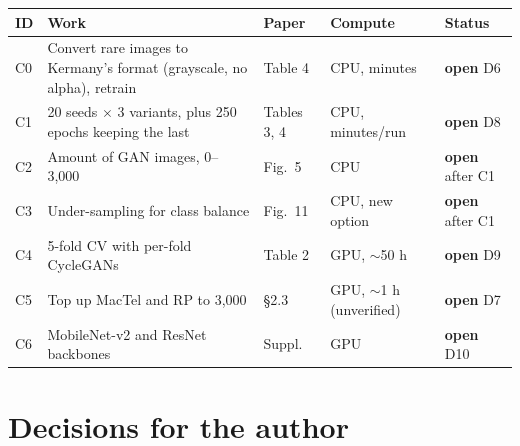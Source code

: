 \documentclass[10pt,a4paper]{article}
\newcommand{\todo}{\textcolor{bad}{\textbf{open}}}
\begin{document}
\noindent
\begin{tabularx}{\linewidth}{@{}l Y l l l@{}}
\toprule
ID & Work & Paper & Compute & Status \\
\midrule
C0 & Convert rare images to Kermany's format (grayscale, no alpha), retrain & Table 4 & CPU, minutes & \todo{} D6 \\
C1 & 20 seeds $\times$ 3 variants, plus 250 epochs keeping the last & Tables 3, 4 & CPU, minutes/run & \todo{} D8 \\
C2 & Amount of GAN images, 0--3,000 & Fig.~5 & CPU & \todo{} after C1 \\
C3 & Under-sampling for class balance & Fig.~11 & CPU, new option & \todo{} after C1 \\
C4 & 5-fold CV with per-fold CycleGANs & Table 2 & GPU, $\sim$50 h & \todo{} D9 \\
C5 & Top up MacTel and RP to 3,000 & \S2.3 & GPU, $\sim$1 h (unverified) & \todo{} D7 \\
C6 & MobileNet-v2 and ResNet backbones & Suppl. & GPU & \todo{} D10 \\
\bottomrule
\end{tabularx}

\section{Decisions for the author}
\end{document}
